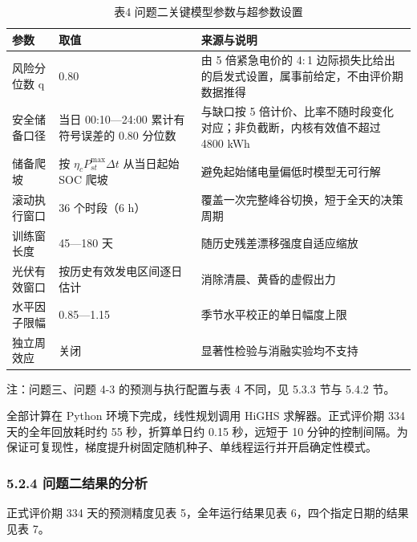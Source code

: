 \documentclass[12pt,a4paper]{ctexart}
\begin{document}
\begin{table}[H]
\centering
\caption*{表4 问题二关键模型参数与超参数设置}
\begin{tabular}{C{0.24\textwidth}C{0.38\textwidth}C{0.38\textwidth}}
\toprule
参数 & 取值 & 来源与说明 \\
\midrule
风险分位数 q & 0.80 & 由 5 倍紧急电价的 4$:$1 边际损失比给出的启发式设置，属事前给定，不由评价期数据推得 \\
安全储备口径 & 当日 00:10—24:00 累计有符号误差的 0.80 分位数 & 与缺口按 5 倍计价、比率不随时段变化对应；非负截断，内核有效值不超过 4800 kWh \\
储备爬坡 & 按 $\eta_c P_{st}^{\max}\Delta t$ 从当日起始 SOC 爬坡 & 避免起始储电量偏低时模型无可行解 \\
滚动执行窗口 & 36 个时段（6 h） & 覆盖一次完整峰谷切换，短于全天的决策周期 \\
训练窗长度 & 45—180 天 & 随历史残差漂移强度自适应缩放 \\
光伏有效窗口 & 按历史有效发电区间逐日估计 & 消除清晨、黄昏的虚假出力 \\
水平因子限幅 & 0.85—1.15 & 季节水平校正的单日幅度上限 \\
独立周效应 & 关闭 & 显著性检验与消融实验均不支持 \\
\bottomrule
\end{tabular}
\par\vspace{2pt}\footnotesize 注：问题三、问题 4-3 的预测与执行配置与表 4 不同，见 5.3.3 节与 5.4.2 节。
\end{table}

全部计算在 Python 环境下完成，线性规划调用 HiGHS 求解器。正式评价期 334 天的全年回放耗时约 55 秒，折算单日约 0.15 秒，远短于 10 分钟的控制间隔。为保证可复现性，梯度提升树固定随机种子、单线程运行并开启确定性模式。

\subsubsection*{5.2.4 问题二结果的分析}

正式评价期 334 天的预测精度见表 5，全年运行结果见表 6，四个指定日期的结果见表 7。
\end{document}
